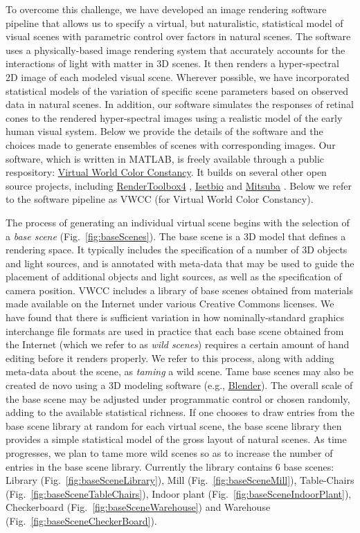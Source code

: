 \documentclass{jov}
\begin{document}
To overcome this  challenge, we have developed an image rendering software pipeline that allows us to specify a virtual, but naturalistic, statistical model of visual scenes with parametric control over factors in natural scenes. The software uses a physically-based image rendering system that accurately accounts for the interactions of light with matter in 3D scenes. It then renders a hyper-spectral 2D image of each modeled visual scene. Wherever possible, we have incorporated statistical models of the variation of specific scene parameters based on observed data in natural scenes. In addition, our software simulates the responses of retinal cones to the rendered hyper-spectral images using a realistic model of the early human visual system. Below we provide the details of the software and the choices made to generate ensembles of scenes with corresponding images. Our software, which is written in MATLAB, is freely available through a public respository: \href{https://github.com/BrainardLab/VirtualWorldColorConstancy}{Virtual World Color Constancy}. It builds on several other open source projects, including \href{http://rendertoolbox.org}{RenderToolbox4} \cite{heasly2014rendertoolbox3}, \href{http://isetbio.org}{Isetbio} and \href{https://www.mitsuba-renderer.org}{Mitsuba} \cite{jakob2015mitsuba}. Below we refer to the software pipeline as VWCC (for Virtual World Color Constancy).

The process of generating an individual virtual scene begins with the selection of a \textit{base scene} (Fig.~\ref{fig:baseScenes}). The base scene is a 3D model that defines a rendering space.  It typically includes the specification of a number of 3D objects and light sources, and is annotated with meta-data that may be used to guide the placement of additional objects and light sources, as well as the specification of camera position. VWCC includes a library of base scenes obtained from materials made available on the Internet under various Creative Commons licenses. We have found that there is sufficient variation in how nominally-standard graphics interchange file formats are used in practice that each base scene obtained from the Internet (which we refer to as \textit{wild scenes}) requires a certain amount of hand editing before it renders properly. We refer to this process, along with adding meta-data about the scene, as \textit{taming} a wild scene. Tame base scenes may also be created de novo using a 3D modeling software (e.g., \href{https://www.blender.org/}{Blender}).  The overall scale of the base scene may be adjusted under programmatic control or chosen randomly, adding to the available statistical richness. If one chooses to draw entries from the base scene library at random for each virtual scene, the base scene library then provides a simple statistical model of the gross layout of natural scenes. As time progresses, we plan to tame more wild scenes so as to increase the number of entries in the base scene library. Currently the library contains 6 base scenes: Library (Fig.~\ref{fig:baseSceneLibrary}), Mill (Fig.~\ref{fig:baseSceneMill}), Table-Chairs (Fig.~\ref{fig:baseSceneTableChairs}), Indoor plant (Fig.~\ref{fig:baseSceneIndoorPlant}), Checkerboard (Fig.~\ref{fig:baseSceneWarehouse}) and Warehouse (Fig.~\ref{fig:baseSceneCheckerBoard}).
\end{document}
